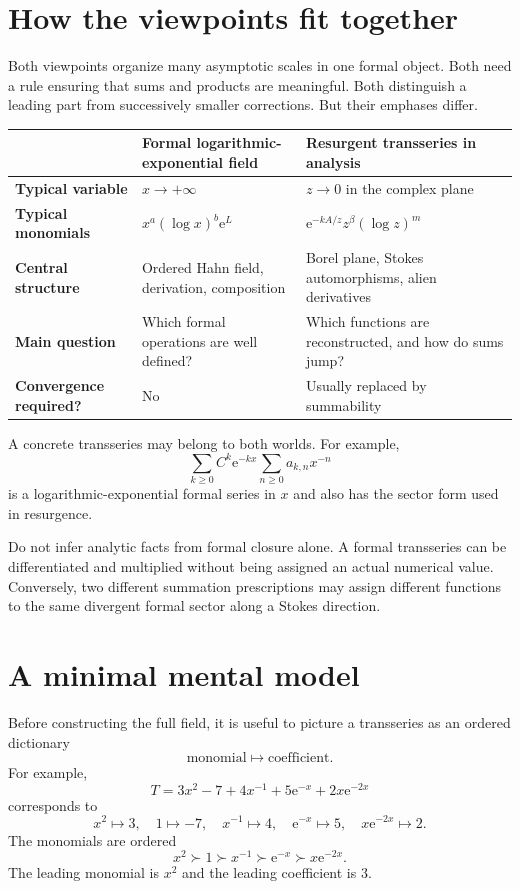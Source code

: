 \documentclass[11pt,openany]{book}
\theoremstyle{definition}
\theoremstyle{plain}
\theoremstyle{remark}
\newcommand{\e}{\mathrm{e}}
\newcommand{\succdom}{\succ}
\begin{document}
\section{How the viewpoints fit together}

Both viewpoints organize many asymptotic scales in one formal object. Both need a rule ensuring that sums and products are meaningful. Both distinguish a leading part from successively smaller corrections. But their emphases differ.

\begin{center}
\small
\begin{tabularx}{\textwidth}{@{}>{\bfseries}p{}XX@{}}
\toprule
 & Formal logarithmic-exponential field & Resurgent transseries in analysis \\
\midrule
Typical variable & $x\to+\infty$ & $z\to0$ in the complex plane \\
Typical monomials & $x^a(\log x)^b\e^L$ & $\e^{-kA/z}z^{\beta} (\log z)^m$ \\
Central structure & Ordered Hahn field, derivation, composition & Borel plane, Stokes automorphisms, alien derivatives \\
Main question & Which formal operations are well defined? & Which functions are reconstructed, and how do sums jump? \\
Convergence required? & No & Usually replaced by summability \\
\bottomrule
\end{tabularx}
\end{center}

A concrete transseries may belong to both worlds. For example,
\[
 \sum_{k\ge0}C^k\e^{-kx}\sum_{n\ge0}a_{k,n}x^{-n}
\]
is a logarithmic-exponential formal series in $x$ and also has the sector form used in resurgence.

\begin{warningbox}
Do not infer analytic facts from formal closure alone. A formal transseries can be differentiated and multiplied without being assigned an actual numerical value. Conversely, two different summation prescriptions may assign different functions to the same divergent formal sector along a Stokes direction.
\end{warningbox}

\section{A minimal mental model}

Before constructing the full field, it is useful to picture a transseries as an ordered dictionary
\[
 \text{monomial}\longmapsto\text{coefficient}.
\]
For example,
\[
 T=3x^2-7+4x^{-1}+5\e^{-x}+2x\e^{-2x}
\]
corresponds to
\[
 x^2\mapsto3,
 \quad1\mapsto-7,
 \quad x^{-1}\mapsto4,
 \quad\e^{-x}\mapsto5,
 \quad x\e^{-2x}\mapsto2.
\]
The monomials are ordered
\[
 x^2\succdom1\succdom x^{-1}\succdom\e^{-x}\succdom x\e^{-2x}.
\]
The leading monomial is $x^2$ and the leading coefficient is $3$.
\end{document}

